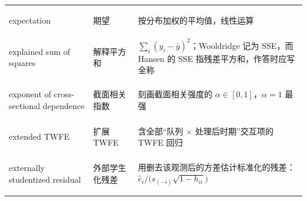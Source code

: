 \begin{longtable}{@{}>{\bfseries\boldmath\raggedright\arraybackslash}p{4.6cm}>{\raggedright\arraybackslash}p{3.2cm}>{\raggedright\arraybackslash}p{\dimexpr\textwidth-7.8cm-4\tabcolsep\relax}@{}}
expectation & 期望 & 按分布加权的平均值，线性运算 \\
explained sum of squares & 解释平方和 & $\sum_i(\hat y_i-\bar y)^2$；Wooldridge 记为 SSE，而 Hansen 的 SSE 指残差平方和，作答时应写全称 \\
exponent of cross-sectional dependence & 截面相关指数 & 刻画截面相关强度的 $\alpha\in[0,1]$，$\alpha=1$ 最强 \\
extended TWFE & 扩展 TWFE & 含全部“队列 $\times$ 处理后时期”交互项的 TWFE 回归 \\
externally studentized residual & 外部学生化残差 & 用删去该观测后的方差估计标准化的残差：$\hat e_i/\big(s_{(-i)}\sqrt{1-h_{ii}}\big)$ \\
\end{longtable}

\par{}\ifdim\dimexpr\pagegoal-\pagetotal\relax<16\baselineskip\newpage\fi

